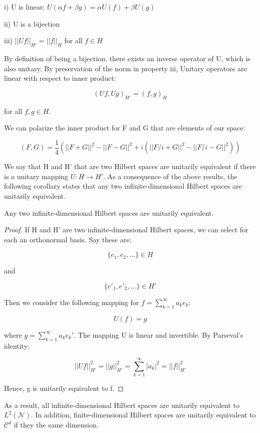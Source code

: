 \documentclass[class=article, crop=false]{standalone}
\begin{document}
				i) U is linear; $U(\alpha f + \beta g) = \alpha U(f) + \beta U(g)$

				ii) U is a bijection

				iii) $||Uf||_{H'} = ||f||_H$ for all $f \in H$

			By definition of being a bijection, there exists an inverse operator of U, which is also unitary. By preservation of the norm in property iii, Unitary operators are linear with respect to inner product:

				$$(Uf, Ug)_{H'} = (f, g)_H$$

			for all $f, g \in H$.

			We can polarize the inner product for F and G that are elements of our space:

				$$(F, G) = \frac{1}{4} ( ||F + G||^2 - ||F - G||^2 + i (||F/i + G||^2 - ||F/i - G||^2))$$


			We say that H and H' that are two Hilbert spaces are unitarily equivalent if there is a unitary mapping $U: H \rightarrow H'$. As a consequence of the above results, the following corollary states that any two infinite-dimensional Hilbert spaces are unitarily equivalent.

			\begin{corollary} 
				Any two infinite-dimensional Hilbert spaces are unitarily equivalent.
			\end{corollary}
			\begin{proof}
				If H and H' are two infinite-dimensional Hilbert spaces, we can select for each an orthonormal basis. Say these are:

					$$\{e_1, e_2, ...\} \in H$$

				and

					$$\{e'_1, e'_2, ...\} \in H'$$

				Then we consider the following mapping for $f = \sum_{k=1}^\infty a_k e_k$:

					$$U(f) = g$$

				where $g = \sum_{k=1}^\infty a_k e_k'$. The mapping U is linear and invertible. By Parseval's identity:

					$$||Uf||_{H'}^2 = ||g||_{H'}^2 = \sum_{k=1}^\infty |a_k|^2 = ||f||_{H'}^2$$

				Hence, g is unitarily equivalent to f.
			\end{proof}

			As a result, all infinite-dimensional Hilbert spaces are unitarily equivalent to $L^2(\mathcal{N})$. In addition, finite-dimensional Hilbert spaces are unitarily equivalent to $\mathcal{C}^d$ if they the same dimension. 
\end{document}
